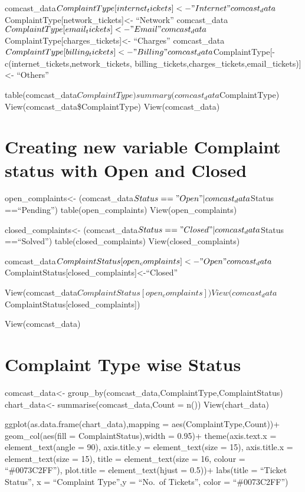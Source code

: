 \documentclass[
]{article}
\begin{document}
comcast\_data\(ComplaintType[internet_tickets]<- "Internet" comcast_data\)ComplaintType{[}network\_tickets{]}\textless-
``Network''
comcast\_data\(ComplaintType[email_tickets]<- "Email" comcast_data\)ComplaintType{[}charges\_tickets{]}\textless-
``Charges''
comcast\_data\(ComplaintType[billing_tickets]<- "Billing" comcast_data\)ComplaintType{[}-c(internet\_tickets,network\_tickets,
billing\_tickets,charges\_tickets,email\_tickets){]}\textless-
``Others''

table(comcast\_data\(ComplaintType) summary(comcast_data\)ComplaintType)
View(comcast\_data\$ComplaintType) View(comcast\_data)

\hypertarget{creating-new-variable-complaint-status-with-open-and-closed}{%
\section{Creating new variable Complaint status with Open and
Closed}\label{creating-new-variable-complaint-status-with-open-and-closed}}

open\_complaints\textless-
(comcast\_data\(Status == "Open"|comcast_data\)Status ==``Pending'')
table(open\_complaints) View(open\_complaints)

closed\_complaints\textless-
(comcast\_data\(Status == "Closed"|comcast_data\)Status ==``Solved'')
table(closed\_complaints) View(closed\_complaints)

comcast\_data\(ComplaintStatus[open_complaints]<-"Open" comcast_data\)ComplaintStatus{[}closed\_complaints{]}\textless-``Closed''

View(comcast\_data\(ComplaintStatus[open_complaints]) View(comcast_data\)ComplaintStatus{[}closed\_complaints{]})

View(comcast\_data)

\hypertarget{complaint-type-wise-status}{%
\section{Complaint Type wise Status}\label{complaint-type-wise-status}}

comcast\_data\textless-
group\_by(comcast\_data,ComplaintType,ComplaintStatus)
chart\_data\textless- summarise(comcast\_data,Count = n())
View(chart\_data)

ggplot(as.data.frame(chart\_data),mapping = aes(ComplaintType,Count))+
geom\_col(aes(fill = ComplaintStatus),width = 0.95)+ theme(axis.text.x =
element\_text(angle = 90), axis.title.y = element\_text(size = 15),
axis.title.x = element\_text(size = 15), title = element\_text(size =
16, colour = ``\#0073C2FF''), plot.title = element\_text(hjust = 0.5))+
labs(title = ``Ticket Status'', x = ``Complaint Type'',y = ``No.~of
Tickets'', color = ``\#0073C2FF'')
\end{document}
